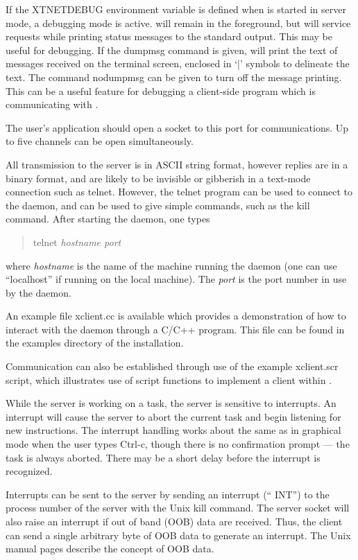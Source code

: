 If the {\et XTNETDEBUG} environment variable is defined when {\Xic} is
started in server mode, a debugging mode is active.  {\Xic} will
remain in the foreground, but will service requests while printing
status messages to the standard output.  This may be useful for
debugging.  If the {\vt dumpmsg} command is given, {\Xic} will print
the text of messages received on the terminal screen, enclosed in `|'
symbols to delineate the text.  The command {\vt nodumpmsg} can be
given to turn off the message printing.  This can be a useful feature
for debugging a client-side program which is communicating with
{\Xic}.

The user's application should open a socket to this port for
communications.  Up to five channels can be open simultaneously.

All transmission to the server is in ASCII string format, however
replies are in a binary format, and are likely to be invisible or
gibberish in a text-mode connection such as {\vt telnet}.  However,
the {\vt telnet} program can be used to connect to the {\Xic} daemon,
and can be used to give simple commands, such as the {\vt kill}
command.  After starting the daemon, one types
\begin{quote}
{\vt telnet} {\it hostname port}
\end{quote}
where {\it hostname} is the name of the machine running the daemon
(one can use ``{\vt localhost}'' if running on the local machine). 
The {\it port} is the port number in use by the daemon.

An example file {\vt xclient.cc} is available which provides a
demonstration of how to interact with the {\Xic} daemon through a
C/C++ program.  This file can be found in the examples directory of
the {\Xic} installation.

Communication can also be established through use of the example {\vt
xclient.scr} script, which illustrates use of script functions to
implement a client within {\Xic}.

While the server is working on a task, the server is sensitive to
interrupts.  An interrupt will cause the server to abort the current
task and begin listening for new instructions.  The interrupt handling
works about the same as in graphical mode when the user types
{\kb Ctrl-c}, though there is no confirmation prompt --- the task is
always aborted.  There may be a short delay before the interrupt is
recognized.
    
Interrupts can be sent to the server by sending an interrupt (``{\vt
INT}'') to the process number of the server with the Unix {\vt kill}
command.  The server socket will also raise an interrupt if out of
band (OOB) data are received.  Thus, the client can send a single
arbitrary byte of OOB data to generate an interrupt.  The Unix manual
pages describe the concept of OOB data.

